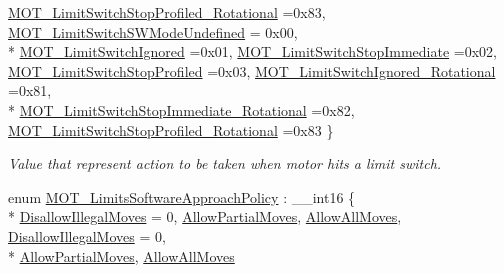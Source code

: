 \begin{DoxyCompactItemize}
\hyperlink{group___common_gga7d4db5fc799ed3fd24818bff565afd85a3becb9439f05020edc6be29dc1098773}{M\+O\+T\+\_\+\+Limit\+Switch\+Stop\+Profiled\+\_\+\+Rotational} =0x83, 
\hyperlink{group___common_gga7d4db5fc799ed3fd24818bff565afd85a4ad3d4ea235e662dc262a8590f1de2da}{M\+O\+T\+\_\+\+Limit\+Switch\+S\+W\+Mode\+Undefined} = 0x00, 
\\*
\hyperlink{group___common_gga7d4db5fc799ed3fd24818bff565afd85aa6281a52eae594413bbdd608ca38e00e}{M\+O\+T\+\_\+\+Limit\+Switch\+Ignored} =0x01, 
\hyperlink{group___common_gga7d4db5fc799ed3fd24818bff565afd85a5ad558f043ef9f21cb0d7adbbbd759a4}{M\+O\+T\+\_\+\+Limit\+Switch\+Stop\+Immediate} =0x02, 
\hyperlink{group___common_gga7d4db5fc799ed3fd24818bff565afd85ada5c4869e7fefa8f76f593d214c0c830}{M\+O\+T\+\_\+\+Limit\+Switch\+Stop\+Profiled} =0x03, 
\hyperlink{group___common_gga7d4db5fc799ed3fd24818bff565afd85a5aabe1197e36ba92db98dca8a959f243}{M\+O\+T\+\_\+\+Limit\+Switch\+Ignored\+\_\+\+Rotational} =0x81, 
\\*
\hyperlink{group___common_gga7d4db5fc799ed3fd24818bff565afd85a7bd2ef0ac74cc97d2e31566748690126}{M\+O\+T\+\_\+\+Limit\+Switch\+Stop\+Immediate\+\_\+\+Rotational} =0x82, 
\hyperlink{group___common_gga7d4db5fc799ed3fd24818bff565afd85a3becb9439f05020edc6be29dc1098773}{M\+O\+T\+\_\+\+Limit\+Switch\+Stop\+Profiled\+\_\+\+Rotational} =0x83
 \}\begin{DoxyCompactList}\small\item\em Value that represent action to be taken when motor hits a limit switch. \end{DoxyCompactList}
\item 
enum \hyperlink{group___common_gad9af9612d4e18c6cd2e7aaaedd6dc49d}{M\+O\+T\+\_\+\+Limits\+Software\+Approach\+Policy} \+: \+\_\+\+\_\+int16 \{ \\*
\hyperlink{group___common_ggad9af9612d4e18c6cd2e7aaaedd6dc49da6ec8cab62f000a14ca800c4cd71a6202}{Disallow\+Illegal\+Moves} = 0, 
\hyperlink{group___common_ggad9af9612d4e18c6cd2e7aaaedd6dc49dab58555d9b6ff3b95a59c5d5fdd085723}{Allow\+Partial\+Moves}, 
\hyperlink{group___common_ggad9af9612d4e18c6cd2e7aaaedd6dc49da9a2933f92f58ac4a4db46005cc29d7ee}{Allow\+All\+Moves}, 
\hyperlink{group___common_ggad9af9612d4e18c6cd2e7aaaedd6dc49da6ec8cab62f000a14ca800c4cd71a6202}{Disallow\+Illegal\+Moves} = 0, 
\\*
\hyperlink{group___common_ggad9af9612d4e18c6cd2e7aaaedd6dc49dab58555d9b6ff3b95a59c5d5fdd085723}{Allow\+Partial\+Moves}, 
\hyperlink{group___common_ggad9af9612d4e18c6cd2e7aaaedd6dc49da9a2933f92f58ac4a4db46005cc29d7ee}{Allow\+All\+Moves}

\end{DoxyCompactItemize}
